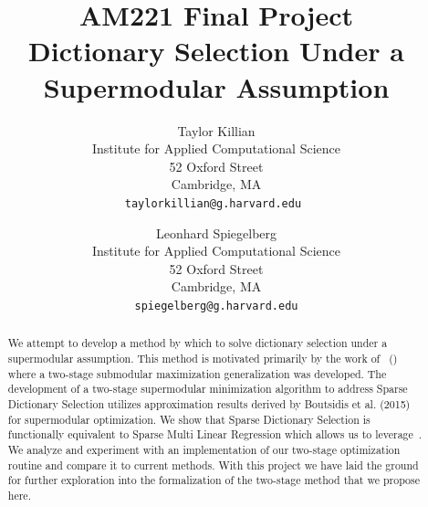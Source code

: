 \documentclass{article}
\makeatletter
\newcommand*{\toccontents}{\@starttoc{toc}}
\makeatother
\begin{document}
\title{\Huge AM221 Final Project \\ \Large Dictionary Selection Under a Supermodular Assumption}
\singlespacing
\author{
  Taylor Killian\\
           \small Institute for Applied Computational Science\\
	\small 52 Oxford Street\\
	\small Cambridge, MA\\
  \texttt{taylorkillian@g.harvard.edu }
  \and
  Leonhard Spiegelberg\\
         \small Institute for Applied Computational Science\\
	\small 52 Oxford Street\\
	\small Cambridge, MA\\
 \texttt{spiegelberg@g.harvard.edu}
}
\maketitle
\doublespacing
\begin{abstract}
We attempt to develop a method by which to solve dictionary selection under a supermodular assumption. This method is motivated primarily by the work of \citeauthor{Singer16TwoStage}~(\citeyear{Singer16TwoStage}) ~\cite{Singer16TwoStage} where a two-stage submodular maximization generalization was developed. The development of a two-stage supermodular minimization algorithm to address Sparse Dictionary Selection utilizes approximation results derived by Boutsidis et al. (2015)~\cite{weaklyalpha} for supermodular optimization. We show that Sparse Dictionary Selection is functionally equivalent to Sparse Multi Linear Regression which allows us to leverage~\cite{weaklyalpha}. We analyze and experiment with an implementation of our two-stage optimization routine and compare it to current methods. With this project we have laid the ground for further exploration into the formalization of the two-stage method that we propose here.
\end{abstract}

\vfill
\singlespacing
\begin{center}
\bfseries\contentsname
\end{center}
\toccontents
\clearpage

\doublespacing
\end{document}
